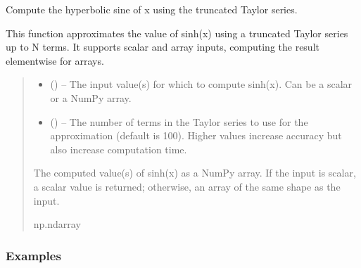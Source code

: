 \documentclass[a4paper,10pt,oneside,english]{sphinxmanual}
\begin{document}
\begin{fulllineitems}
\label{\detokenize{acsefunctions:acsefunctions.functions.sinh}}
\pysigstartsignatures
\pysiglinewithargsret
{}
{\sphinxparamcomma {}}
{}
\pysigstopsignatures
\sphinxAtStartPar
Compute the hyperbolic sine of x using the truncated Taylor series.

\sphinxAtStartPar
This function approximates the value of sinh(x)
using a truncated Taylor series
up to N terms. It supports scalar and array inputs, computing the result
element\sphinxhyphen{}wise for arrays.
\begin{quote}\begin{description}
\begin{itemize}
\item {} 
\sphinxAtStartPar
{} () – The input value(s) for which to compute sinh(x). Can be a scalar or a
NumPy array.

\item {} 
\sphinxAtStartPar
{} (\sphinxstyleliteralemphasis{\sphinxupquote{, }}) – The number of terms in the Taylor series to use for the approximation
(default is 100). Higher values increase accuracy but also increase
computation time.

\end{itemize}

\sphinxAtStartPar
The computed value(s) of sinh(x) as a NumPy array.
If the input is scalar,
a scalar value is returned; otherwise,
an array of the same shape as the input.

\sphinxAtStartPar
np.ndarray

\end{description}\end{quote}
\subsubsection*{Examples}

\begin{sphinxVerbatim}[commandchars=\\\{\}]
\end{sphinxVerbatim}


\end{fulllineitems}
\end{document}

